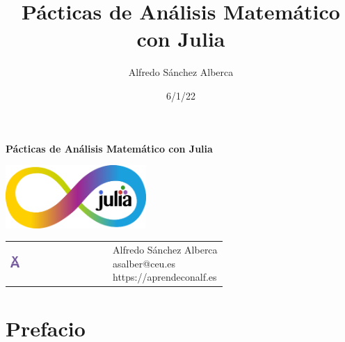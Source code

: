 \documentclass[
  a4paper,
]{scrreport}
\title{Pácticas de Análisis Matemático con Julia}
\author{Alfredo Sánchez Alberca}
\date{6/1/22}
\renewcommand*\contentsname{Tabla de contenidos}
\newcommand\contentsname{Tabla de contenidos}
\theoremstyle{definition}
\theoremstyle{remark}
\begin{document}
\begin{titlepage}

\begin{center}
\vspace*{5cm}

\Huge
{\textbf{\textsf{Pácticas de Análisis Matemático con Julia}}}

\vspace{0.5cm}
\LARGE
{\textbf{\textsf{}}}

\vspace{1.5cm}

\includegraphics[width=0.4\textwidth]{img/logos/infinito-julia.png}
\end{center}

\vfill

\begin{flushleft}
\begin{tabular}{ll}
\includegraphics[width=0.1\textwidth]{img/logos/aprendeconalf.png} & \parbox[b]{5cm}{\Large\textsf{Alfredo
Sánchez
Alberca}\\ \textsf{asalber@ceu.es} \\ \textsf{https://aprendeconalf.es}}
\end{tabular}
\end{flushleft}
\end{titlepage}\ifdefined\Shaded\renewenvironment{Shaded}{\begin{tcolorbox}[enhanced, boxrule=0pt, borderline west={3pt}{0pt}{shadecolor}, sharp corners, breakable, interior hidden, frame hidden]}{\end{tcolorbox}}\fi

\renewcommand*\contentsname{Tabla de contenidos}
{
\hypersetup{linkcolor=}
\setcounter{tocdepth}{2}
\tableofcontents
}

\hypertarget{prefacio}{%
\chapter*{Prefacio}\label{prefacio}}
\end{document}
